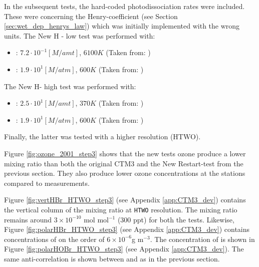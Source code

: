 
In the subsequent tests, the hard-coded photodissociation rates were included. These were concerning the Henry-coefficient (see Section \ref{sec:wet_dep_henrys_law}) which was initially implemented with the wrong units. The New H - low test was performed with: 


\begin{itemize}
    \item {}: $7.2\cdot 10^{-1} [M/amt]$, $6100 K$ (Taken from: \cite{Chameides1992})
    \item {}: $1.9\cdot10^1 [M/atm]$, $600 K$ (Taken from: \cite{dean1999})
\end{itemize}

The New H- high test was performed with:  

\begin{itemize}
    \item {}: $2.5 \cdot 10^{1} [M/amt]$, $370 K$ (Taken from: \cite{dean1999})
    \item {}: $1.9\cdot10^1 [M/atm]$, $600 K$ (Taken from: \cite{dean1999})
\end{itemize}

Finally, the latter was tested with a higher resolution (HTWO). 

\medskip

Figure \ref{fig:ozone_2001_step3} shows that the new tests ozone produce a lower mixing ratio than both the original CTM3 and the New Restart-test from the previous section. They also produce lower ozone concentrations at the stations compared to measurements. 





\medskip

Figure \ref{fig:vertHBr_HTWO_step3} (see Appendix \ref{app:CTM3_dev}) contains the vertical column of the  mixing ratio at \texttt{HTWO} resolution. The mixing ratio remains around $3\times10^{-10}$ mol mol$^{-1}$ (300 ppt) for both the tests. Likewise, Figure \ref{fig:polarHBr_HTWO_step3} (see Appendix \ref{app:CTM3_dev}) contains concentrations of  on the order of $6\times10^{-6} $g m$^{-3}$. The concentration of  is shown in Figure \ref{fig:polarHOBr_HTWO_step3} (see Appendix \ref{app:CTM3_dev}). The same anti-correlation is shown between  and  as in the previous section. 

